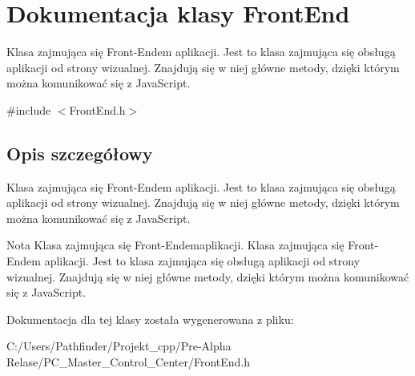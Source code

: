 \hypertarget{class_front_end}{}\section{Dokumentacja klasy Front\+End}
\label{class_front_end}


Klasa zajmująca się Front-\/\+Endem aplikacji. Jest to klasa zajmująca się obsługą aplikacji od strony wizualnej. Znajdują się w niej główne metody, dzięki którym można komunikować się z Java\+Script.  




{\ttfamily \#include $<$Front\+End.\+h$>$}



\subsection{Opis szczegółowy}
Klasa zajmująca się Front-\/\+Endem aplikacji. Jest to klasa zajmująca się obsługą aplikacji od strony wizualnej. Znajdują się w niej główne metody, dzięki którym można komunikować się z Java\+Script. 

\begin{DoxyNote}{Nota}
Klasa zajmująca się Front-\/\+Endemaplikacji. Klasa zajmująca się Front-\/\+Endem aplikacji. Jest to klasa zajmująca się obsługą aplikacji od strony wizualnej. Znajdują się w niej główne metody, dzięki którym można komunikować się z Java\+Script. 
\end{DoxyNote}


Dokumentacja dla tej klasy została wygenerowana z pliku\+:\begin{DoxyCompactItemize}
\item 
C\+:/\+Users/\+Pathfinder/\+Projekt\+\_\+cpp/\+Pre-\/\+Alpha Relase/\+P\+C\+\_\+\+Master\+\_\+\+Control\+\_\+\+Center/Front\+End.\+h\end{DoxyCompactItemize}
